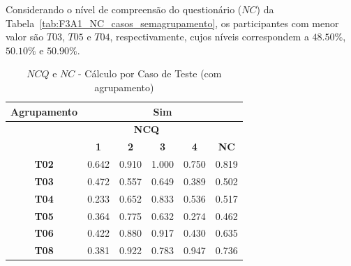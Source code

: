 Considerando o nível de compreensão do questionário ($NC$) da Tabela~\ref{tab:F3A1_NC_casos_semagrupamento}, os participantes com menor valor são $T03$, $T05$ e $T04$, respectivamente, cujos níveis correspondem a $48.50\%$, $50.10\%$ e $50.90\%$.

\begin{table}[htbp]
	\centering
	\caption{$NCQ$ e $NC$ - Cálculo por Caso de Teste (com agrupamento)}
	\begin{tabular}{|c|lllll|}
		\hline
		\cellcolor[HTML]{F2F2F2}\textbf{Agrupamento} & \multicolumn{5}{c|}{Sim} \\ \hline
		\rowcolor[HTML]{D0CECE} 
		\cellcolor[HTML]{D0CECE} & \multicolumn{4}{c|}{\cellcolor[HTML]{D0CECE}\textbf{NCQ}} & \multicolumn{1}{c|}{\cellcolor[HTML]{D0CECE}} \\ \cline{2-5}
		\rowcolor[HTML]{D0CECE} 
		\multirow{-2}{*}{\cellcolor[HTML]{D0CECE}\textbf{Participante}} & \multicolumn{1}{c|}{\cellcolor[HTML]{D0CECE}\textbf{1}} & \multicolumn{1}{c|}{\cellcolor[HTML]{D0CECE}\textbf{2}} & \multicolumn{1}{c|}{\cellcolor[HTML]{D0CECE}\textbf{3}} & \multicolumn{1}{c|}{\cellcolor[HTML]{D0CECE}\textbf{4}} & \multicolumn{1}{c|}{\multirow{-2}{*}{\cellcolor[HTML]{D0CECE}\textbf{NC}}} \\ \hline
		\textbf{T02} & \multicolumn{1}{l|}{0.642} & \multicolumn{1}{l|}{0.910} & \multicolumn{1}{l|}{1.000} & \multicolumn{1}{l|}{0.750} & 0.819 \\ \hline
		\rowcolor[HTML]{F2F2F2} 
		\textbf{T03} & \multicolumn{1}{l|}{\cellcolor[HTML]{F2F2F2}0.472} & \multicolumn{1}{l|}{\cellcolor[HTML]{F2F2F2}0.557} & \multicolumn{1}{l|}{\cellcolor[HTML]{F2F2F2}0.649} & \multicolumn{1}{l|}{\cellcolor[HTML]{F2F2F2}0.389} & 0.502 \\ \hline
		\textbf{T04} & \multicolumn{1}{l|}{0.233} & \multicolumn{1}{l|}{0.652} & \multicolumn{1}{l|}{0.833} & \multicolumn{1}{l|}{0.536} & 0.517 \\ \hline
		\rowcolor[HTML]{F2F2F2} 
		\textbf{T05} & \multicolumn{1}{l|}{\cellcolor[HTML]{F2F2F2}0.364} & \multicolumn{1}{l|}{\cellcolor[HTML]{F2F2F2}0.775} & \multicolumn{1}{l|}{\cellcolor[HTML]{F2F2F2}0.632} & \multicolumn{1}{l|}{\cellcolor[HTML]{F2F2F2}0.274} & 0.462 \\ \hline
		\textbf{T06} & \multicolumn{1}{l|}{0.422} & \multicolumn{1}{l|}{0.880} & \multicolumn{1}{l|}{0.917} & \multicolumn{1}{l|}{0.430} & 0.635 \\ \hline
		\rowcolor[HTML]{F2F2F2} 
		\textbf{T08} & \multicolumn{1}{l|}{\cellcolor[HTML]{F2F2F2}0.381} & \multicolumn{1}{l|}{\cellcolor[HTML]{F2F2F2}0.922} & \multicolumn{1}{l|}{\cellcolor[HTML]{F2F2F2}0.783} & \multicolumn{1}{l|}{\cellcolor[HTML]{F2F2F2}0.947} & 0.736 \\ \hline

\end{tabular}
\end{table}
